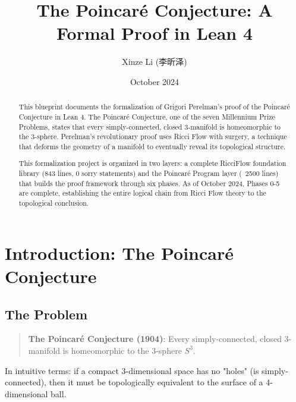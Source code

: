 
\title{The Poincaré Conjecture: A Formal Proof in Lean 4}
\author{Xinze Li (李昕泽)}
\date{October 2024}

\maketitle

\begin{abstract}
This blueprint documents the formalization of Grigori Perelman's proof of the Poincaré Conjecture in Lean 4. The Poincaré Conjecture, one of the seven Millennium Prize Problems, states that every simply-connected, closed 3-manifold is homeomorphic to the 3-sphere. Perelman's revolutionary proof uses Ricci Flow with surgery, a technique that deforms the geometry of a manifold to eventually reveal its topological structure.

This formalization project is organized in two layers: a complete RicciFlow foundation library (843 lines, 0 sorry statements) and the Poincaré Program layer (~2500 lines) that builds the proof framework through six phases. As of October 2024, Phases 0-5 are complete, establishing the entire logical chain from Ricci Flow theory to the topological conclusion.
\end{abstract}

\tableofcontents

\chapter{Introduction: The Poincaré Conjecture}
\label{chap:introduction}

\section{The Problem}

\begin{quote}
\textbf{The Poincaré Conjecture (1904)}: Every simply-connected, closed 3-manifold is homeomorphic to the 3-sphere $S^3$.
\end{quote}

In intuitive terms: if a compact 3-dimensional space has no "holes" (is simply-connected), then it must be topologically equivalent to the surface of a 4-dimensional ball.

